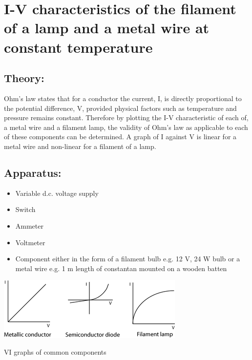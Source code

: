 \documentclass{tufte-handout}
\begin{document}
\section{I-V characteristics of the filament of a lamp and a metal wire at constant temperature}
\subsection{Theory:} 
Ohm's law states that for a conductor the current, I, is directly proportional to the potential difference, V, provided physical factors such as temperature and pressure remains constant.  Therefore by plotting the I-V characteristic of each of, a metal wire and a filament lamp, the validity of Ohm's law as applicable to each of these components can be determined. A graph of I against V is linear for a metal wire and non-linear for a filament of a lamp. 
\subsection{Apparatus:}
\begin {itemize}
\item Variable d.c. voltage supply 
\item Switch 
\item Ammeter 
\item Voltmeter 
\item Component either in the form of a filament bulb e.g. 12 V, 24 W bulb or a metal wire e.g. 1 m length of constantan mounted on a wooden batten 
\end{itemize}
\begin{marginfigure}
\includegraphics[]{vigraphs.png}
\caption{VI graphs of common components}
\end{marginfigure}
\end{document}
